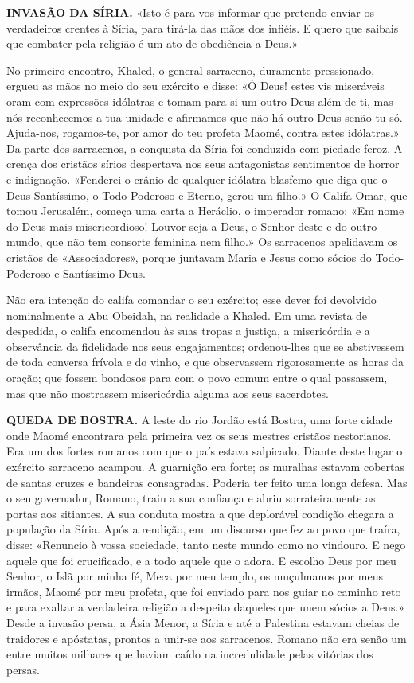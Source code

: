 \documentclass[11pt,a5paper,twoside,openany]{book}
\begin{document}
\textbf{INVASÃO DA SÍRIA.} «Isto é para vos informar que pretendo enviar os verdadeiros crentes à Síria, para tirá-la das mãos dos infiéis. E quero que saibais que combater pela religião é um ato de obediência a Deus.»

No primeiro encontro, Khaled, o general sarraceno, duramente pressionado, ergueu as mãos no meio do seu exército e disse: «Ó Deus! estes vis miseráveis oram com expressões idólatras e tomam para si um outro Deus além de ti, mas nós reconhecemos a tua unidade e afirmamos que não há outro Deus senão tu só. Ajuda-nos, rogamos-te, por amor do teu profeta Maomé, contra estes idólatras.» Da parte dos sarracenos, a conquista da Síria foi conduzida com piedade feroz. A crença dos cristãos sírios despertava nos seus antagonistas sentimentos de horror e indignação. «Fenderei o crânio de qualquer idólatra blasfemo que diga que o Deus Santíssimo, o Todo-Poderoso e Eterno, gerou um filho.» O Califa Omar, que tomou Jerusalém, começa uma carta a Heráclio, o imperador romano: «Em nome do Deus mais misericordioso! Louvor seja a Deus, o Senhor deste e do outro mundo, que não tem consorte feminina nem filho.» Os sarracenos apelidavam os cristãos de «Associadores», porque juntavam Maria e Jesus como sócios do Todo-Poderoso e Santíssimo Deus.

Não era intenção do califa comandar o seu exército; esse dever foi devolvido nominalmente a Abu Obeidah, na realidade a Khaled. Em uma revista de despedida, o califa encomendou às suas tropas a justiça, a misericórdia e a observância da fidelidade nos seus engajamentos; ordenou-lhes que se abstivessem de toda conversa frívola e do vinho, e que observassem rigorosamente as horas da oração; que fossem bondosos para com o povo comum entre o qual passassem, mas que não mostrassem misericórdia alguma aos seus sacerdotes.

\textbf{QUEDA DE BOSTRA.} A leste do rio Jordão está Bostra, uma forte cidade onde Maomé encontrara pela primeira vez os seus mestres cristãos nestorianos. Era um dos fortes romanos com que o país estava salpicado. Diante deste lugar o exército sarraceno acampou. A guarnição era forte; as muralhas estavam cobertas de santas cruzes e bandeiras consagradas. Poderia ter feito uma longa defesa. Mas o seu governador, Romano, traiu a sua confiança e abriu sorrateiramente as portas aos sitiantes. A sua conduta mostra a que deplorável condição chegara a população da Síria. Após a rendição, em um discurso que fez ao povo que traíra, disse: «Renuncio à vossa sociedade, tanto neste mundo como no vindouro. E nego aquele que foi crucificado, e a todo aquele que o adora. E escolho Deus por meu Senhor, o Islã por minha fé, Meca por meu templo, os muçulmanos por meus irmãos, Maomé por meu profeta, que foi enviado para nos guiar no caminho reto e para exaltar a verdadeira religião a despeito daqueles que unem sócios a Deus.» Desde a invasão persa, a Ásia Menor, a Síria e até a Palestina estavam cheias de traidores e apóstatas, prontos a unir-se aos sarracenos. Romano não era senão um entre muitos milhares que haviam caído na incredulidade pelas vitórias dos persas.
\end{document}
